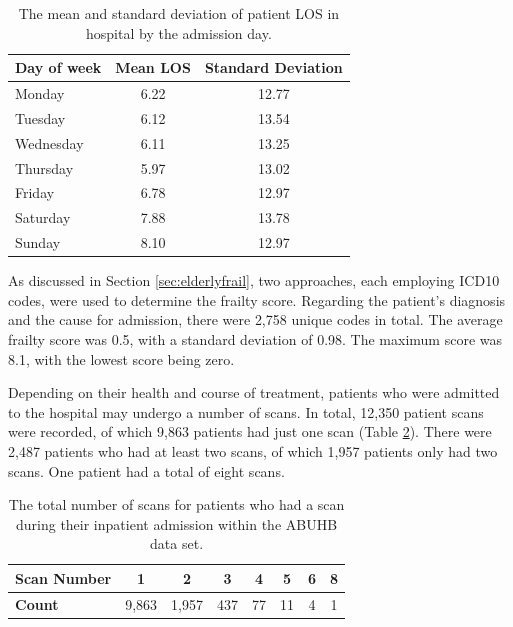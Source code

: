 \documentclass[../thesis.tex]{subfiles}
\begin{document}
\begin{table}[h!]
    \centering
    \begin{tabular}{lcc}\toprule
    \textbf{Day of week} & \textbf{Mean LOS} & \textbf{Standard Deviation}\\    \midrule
    Monday & 6.22 & 12.77\\
    Tuesday & 6.12 & 13.54\\
    Wednesday &6.11 &13.25\\
    Thursday &5.97 & 13.02\\
    Friday &6.78  &12.97\\
    Saturday & 7.88 & 13.78\\
    Sunday & 8.10  &12.97\\ \bottomrule
    \end{tabular}
    \caption{The mean and standard deviation of patient LOS in hospital by the admission day.}
    \label{tab:DayLOS}
\end{table}

As discussed in Section \ref{sec:elderlyfrail}, two approaches, each employing ICD10 codes, were used to determine the frailty score. Regarding the patient's diagnosis and the cause for admission, there were 2,758 unique codes in total. The average frailty score was 0.5, with a standard deviation of 0.98. The maximum score was 8.1, with the lowest score being zero.

Depending on their health and course of treatment, patients who were admitted to the hospital may undergo a number of scans. In total, 12,350 patient scans were recorded, of which 9,863 patients had just one scan (Table \ref{Tab:Scan}). There were 2,487 patients who had at least two scans, of which 1,957 patients only had two scans. One patient had a total of eight scans. 

\begin{table}[h!]
    \centering
    \begin{tabular}{lccccccc}\toprule
    \textbf{Scan Number} & \textbf{1} & \textbf{2} & \textbf{3} & \textbf{4} & \textbf{5} & \textbf{6} & \textbf{8}   \\ \midrule
\textbf{Count} & 9,863 & 1,957 & 437 & 77 & 11 & 4& 1\\ \bottomrule
    \end{tabular}
    \caption{The total number of scans for patients who had a scan during their inpatient admission within the ABUHB data set.}
    \label{Tab:Scan}
\end{table}
\end{document}
